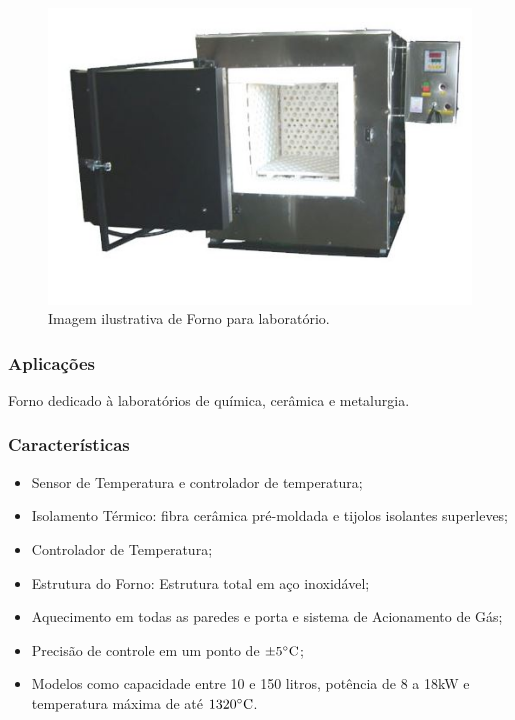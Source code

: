 \begin{figure}[!h]
	\centering
	\label{forno_laboratorio}
	\includegraphics[keepaspectratio=true,scale=0.8]{figuras/forno_laboratorio.JPG}
	\caption{Imagem ilustrativa de Forno para laboratório.}
\end{figure}

\subsubsection{Aplicações}

Forno dedicado à laboratórios de química, cerâmica e metalurgia.

\subsubsection{Características}

\begin{itemize}
	\item Sensor de Temperatura e controlador de temperatura;
	\item Isolamento Térmico: fibra cerâmica pré-moldada e tijolos isolantes superleves;
	\item Controlador de Temperatura;
	\item Estrutura do Forno: Estrutura total em aço inoxidável;
	\item Aquecimento em todas as paredes e porta e sistema de Acionamento de Gás;
	\item Precisão de controle em um ponto de $\pm 5 \degree \text{C}$;
	\item Modelos como capacidade entre 10 e 150 litros, potência de 8 a 18kW e temperatura máxima de até $1320 \degree \text{C}$.
\end{itemize}

